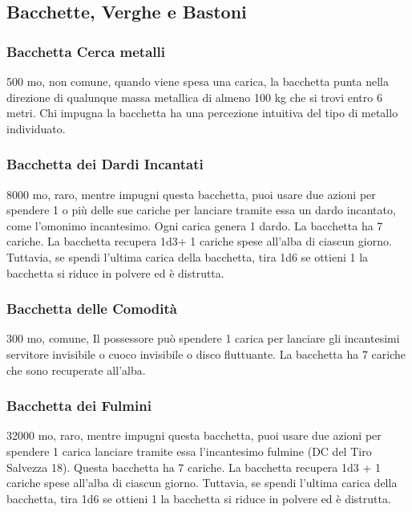\begin{multicols}{2}
\subsection{Bacchette, Verghe e Bastoni}

\subsubsection*{Bacchetta Cerca metalli}
500 mo, non comune, quando viene spesa una carica, la bacchetta punta nella direzione di qualunque massa metallica di almeno 100 kg che si trovi entro 6 metri. Chi impugna la bacchetta ha una percezione intuitiva del tipo di metallo individuato.

\subsubsection*{Bacchetta dei Dardi Incantati}
8000 mo, raro, mentre impugni questa bacchetta, puoi usare due azioni per spendere 1 o più delle sue cariche per lanciare tramite essa un dardo incantato, come l'omonimo incantesimo. Ogni carica genera 1 dardo. La bacchetta ha 7 cariche. La bacchetta recupera 1d3+ 1 cariche spese all'alba di ciascun giorno. Tuttavia, se spendi l'ultima carica della bacchetta, tira 1d6 se ottieni 1 la bacchetta si riduce in polvere ed è distrutta.

\subsubsection*{Bacchetta delle Comodità}
300 mo, comune, Il possessore può spendere 1 carica per lanciare gli incantesimi servitore invisibile o cuoco invisibile o disco fluttuante. La bacchetta ha 7 cariche che sono recuperate all'alba.

\subsubsection*{Bacchetta dei Fulmini}
32000 mo, raro, mentre impugni questa bacchetta, puoi usare due azioni per spendere 1 carica lanciare tramite essa l'incantesimo fulmine (DC del Tiro Salvezza 18).
Questa bacchetta ha 7 cariche. La bacchetta recupera 1d3 + 1 cariche spese all'alba di ciascun giorno. Tuttavia, se spendi l'ultima carica della bacchetta, tira 1d6 se ottieni 1 la bacchetta si riduce in polvere ed è distrutta.


\end{multicols}
